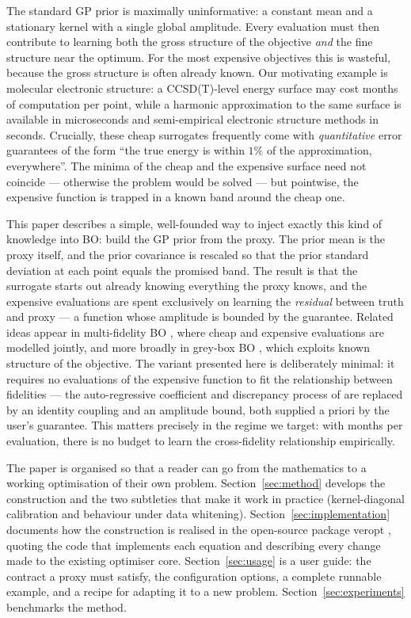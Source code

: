 \documentclass[11pt,a4paper]{article}
\newcommand{\veropt}{\textsf{veropt}}
\begin{document}
The standard GP prior is maximally uninformative: a constant mean and a
stationary kernel with a single global amplitude. Every evaluation must then
contribute to learning both the gross structure of the objective \emph{and}
the fine structure near the optimum. For the most expensive objectives this is
wasteful, because the gross structure is often already known. Our motivating
example is molecular electronic structure: a CCSD(T)-level energy surface may
cost months of computation per point, while a harmonic approximation to the
same surface is available in microseconds and semi-empirical electronic
structure methods in seconds. Crucially, these cheap surrogates frequently
come with \emph{quantitative} error guarantees of the form ``the true energy
is within $1\%$ of the approximation, everywhere''. The minima of the cheap
and the expensive surface need not coincide --- otherwise the problem would be
solved --- but pointwise, the expensive function is trapped in a known band
around the cheap one.

This paper describes a simple, well-founded way to inject exactly this kind of
knowledge into BO: build the GP prior from the proxy. The prior mean is the
proxy itself, and the prior covariance is rescaled so that the prior standard
deviation at each point equals the promised band. The result is that the
surrogate starts out already knowing everything the proxy knows, and the
expensive evaluations are spent exclusively on learning the \emph{residual}
between truth and proxy --- a function whose amplitude is bounded by the
guarantee. Related ideas appear in multi-fidelity BO
\citep{kennedy2000, forrester2007}, where cheap and expensive evaluations are
modelled jointly, and more broadly in grey-box BO \citep{astudillo2021},
which exploits known structure of the objective. The variant presented here
is deliberately minimal: it requires no evaluations of the expensive function
to fit the relationship between fidelities --- the auto-regressive coefficient
and discrepancy process of \citet{kennedy2000} are replaced by an identity
coupling and an amplitude bound, both supplied a priori by the user's
guarantee. This matters precisely in the regime we target: with months per
evaluation, there is no budget to learn the cross-fidelity relationship
empirically.

The paper is organised so that a reader can go from the mathematics to a
working optimisation of their own problem. Section~\ref{sec:method} develops
the construction and the two subtleties that make it work in practice
(kernel-diagonal calibration and behaviour under data whitening).
Section~\ref{sec:implementation} documents how the construction is realised
in the open-source package \veropt{} \citep{veropt}, quoting the code that
implements each equation and describing every change made to the existing
optimiser core. Section~\ref{sec:usage} is a user guide: the contract a proxy
must satisfy, the configuration options, a complete runnable example, and a
recipe for adapting it to a new problem. Section~\ref{sec:experiments}
benchmarks the method.
\end{document}
